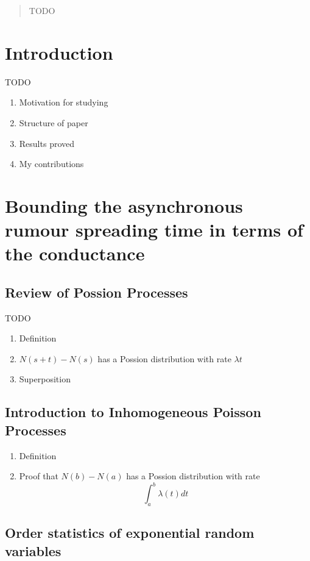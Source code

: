 \documentclass[a4paper,11pt]{article}
\theoremstyle{definition}
\begin{document}



\begin{abstract}
	TODO
\end{abstract}
	
	
\tableofcontents


\section{Introduction}


TODO

\begin{enumerate}
	\item Motivation for studying
	\item Structure of paper
	\item Results proved
	\item My contributions
\end{enumerate}

\section{Bounding the asynchronous rumour spreading time in terms of the conductance}

\subsection{Review of Possion Processes}

TODO

\begin{enumerate}
	\item Definition
	\item $N(s + t) - N(s)$ has a Possion distribution with rate $\lambda t$
	\item Superposition
\end{enumerate}

\subsection{Introduction to Inhomogeneous Poisson Processes}

\begin{enumerate}
	\item Definition
	\item Proof that $N(b) - N(a)$ has a Possion distribution with rate
	$$
		\int_a^b \lambda(t) dt
	$$
\end{enumerate}

\subsection{Order statistics of exponential random variables}
\end{document}
